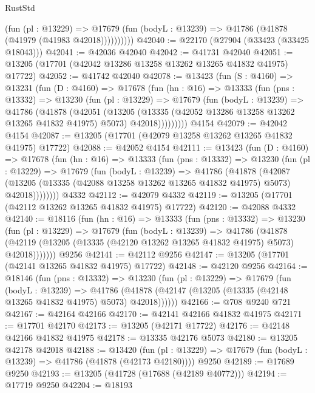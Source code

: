 \begin{lexlean}{RustStd}
\begin{coremodule}
              (fun (pl : @13229) =>
              @17679 (fun (bodyL : @13239) => @41786 (@41878 (@41979 (@41983 @42018))))))))))
@42040 := @22170 (@27904 (@33423 (@33425 @18043)))
@42041 := @42036 @42040
@42042 := @41731 @42040
@42051 := @13205 (@17701 (@42042 @13286 @13258 @13262 @13265 @41832 @41975) @17722)
@42052 := @41742 @42040
@42078 := @13423
    (fun (S : @4160) =>
    @13231
      (fun (D : @4160) =>
      @17678
        (fun (hn : @16) =>
        @13333
          (fun (pns : @13332) =>
          @13230
            (fun (pl : @13229) =>
            @17679
              (fun (bodyL : @13239) =>
              @41786
                (@41878
                  (@42051
                    (@13205
                      (@13335 (@42052 @13286 @13258 @13262 @13265 @41832 @41975) @5073)
                      @42018)))))))))
    @4154
@42079 := @42042 @4154
@42087 := @13205 (@17701 (@42079 @13258 @13262 @13265 @41832 @41975) @17722)
@42088 := @42052 @4154
@42111 := @13423
    (fun (D : @4160) =>
    @17678
      (fun (hn : @16) =>
      @13333
        (fun (pns : @13332) =>
        @13230
          (fun (pl : @13229) =>
          @17679
            (fun (bodyL : @13239) =>
            @41786
              (@41878
                (@42087
                  (@13205 (@13335 (@42088 @13258 @13262 @13265 @41832 @41975) @5073) @42018))))))))
    @4332
@42112 := @42079 @4332
@42119 := @13205 (@17701 (@42112 @13262 @13265 @41832 @41975) @17722)
@42120 := @42088 @4332
@42140 := @18116
    (fun (hn : @16) =>
    @13333
      (fun (pns : @13332) =>
      @13230
        (fun (pl : @13229) =>
        @17679
          (fun (bodyL : @13239) =>
          @41786
            (@41878
              (@42119 (@13205 (@13335 (@42120 @13262 @13265 @41832 @41975) @5073) @42018)))))))
    @9256
@42141 := @42112 @9256
@42147 := @13205 (@17701 (@42141 @13265 @41832 @41975) @17722)
@42148 := @42120 @9256
@42164 := @18146
    (fun (pns : @13332) =>
    @13230
      (fun (pl : @13229) =>
      @17679
        (fun (bodyL : @13239) =>
        @41786 (@41878 (@42147 (@13205 (@13335 (@42148 @13265 @41832 @41975) @5073) @42018))))))
@42166 := @708 @9240 @721
@42167 := @42164 @42166
@42170 := @42141 @42166 @41832 @41975
@42171 := @17701 @42170
@42173 := @13205 (@42171 @17722)
@42176 := @42148 @42166 @41832 @41975
@42178 := @13335 @42176 @5073
@42180 := @13205 @42178 @42018
@42188 := @13420
    (fun (pl : @13229) => @17679 (fun (bodyL : @13239) => @41786 (@41878 (@42173 @42180))))
    @9250
@42189 := @17689 @9250
@42193 := @13205 (@41728 (@17688 (@42189 @40772)))
@42194 := @17719 @9250
@42204 := @18193

\end{coremodule}
\end{lexlean}
